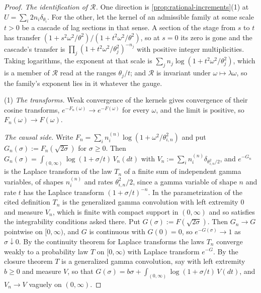 \begin{proof}
\emph{The identification of $\mathcal{R}$.} One direction is
\ref{prop:rational-increments}(1) at $U = \sum_i 2n_i\delta_{\theta_i}$. For the other, let the
kernel of an admissible family at some scale $t > 0$ be a cascade of lag sections in that sense.
A section of the stage from $s$ to $t$ has transfer
$(1 + s^2\omega^2/\theta^2)/(1 + t^2\omega^2/\theta^2)$, so at $s = 0$ its zero is gone and the
cascade's transfer is $\prod_j(1 + t^2\omega^2/\theta_j^2)^{-n_j}$ with positive integer
multiplicities. Taking logarithms, the exponent at that scale is
$\sum_j n_j\log(1 + t^2\omega^2/\theta_j^2)$, which is a member of $\mathcal{R}$ read at the
ranges $\theta_j/t$; and $\mathcal{R}$ is invariant under $\omega \mapsto \lambda\omega$, so the
family's exponent lies in it whatever the gauge.

(1) \emph{The transforms.} Weak convergence of the kernels gives convergence of their cosine
transforms, $e^{-F_n(\omega)} \to e^{-F(\omega)}$ for every $\omega$, and the limit is positive,
so $F_n(\omega) \to F(\omega)$.

\emph{The causal side.} Write $F_n = \sum_i n_i^{(n)}\log(1 + \omega^2/\theta_{i,n}^2)$ and put
$G_n(\sigma) := F_n(\sqrt{2\sigma})$ for $\sigma \ge 0$. Then
$G_n(\sigma) = \int_{(0,\infty)}\log(1 + \sigma/t)\,V_n(dt)$ with
$V_n := \sum_i n_i^{(n)}\delta_{\theta_{i,n}^2/2}$, and $e^{-G_n}$ is the Laplace transform of the
law $T_n$ of a finite sum of independent gamma variables, of shapes $n_i^{(n)}$ and rates
$\theta_{i,n}^2/2$, since a gamma variable of shape $n$ and rate $t$ has the Laplace transform
$(1 + \sigma/t)^{-n}$. In the parametrization of the cited definition $T_n$ is the generalized
gamma convolution with left extremity $0$ and measure $V_n$, which is finite with compact support
in $(0,\infty)$ and so satisfies the integrability conditions asked there. Put
$G(\sigma) := F(\sqrt{2\sigma})$. Then $G_n \to G$ pointwise on $[0,\infty)$, and $G$ is
continuous with $G(0) = 0$, so $e^{-G(\sigma)} \to 1$ as $\sigma \downarrow 0$. By the
continuity theorem for Laplace transforms the laws $T_n$ converge weakly to a probability law
$T$ on $[0,\infty)$ with Laplace transform $e^{-G}$. By the closure theorem $T$ is a generalized
gamma convolution, say with left extremity $b \ge 0$ and measure $V$, so that
$G(\sigma) = b\sigma + \int_{(0,\infty)}\log(1 + \sigma/t)\,V(dt)$, and $V_n \to V$ vaguely on
$(0,\infty)$.


\end{proof}
